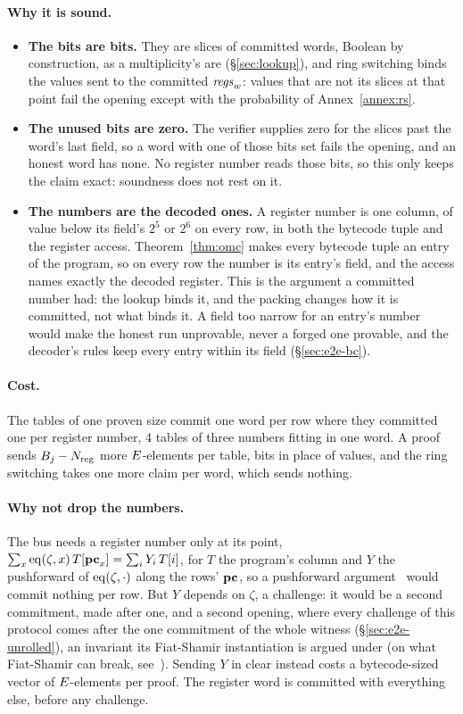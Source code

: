 \paragraph{Why it is sound.}
\begin{itemize}
  \item \textbf{The bits are bits.} They are slices of committed words, Boolean by construction, as a multiplicity's are (\S\ref{sec:lookup}), and ring switching binds the values sent to the committed $\mathit{regs}_{w}$: values that are not its slices at that point fail the opening except with the probability of Annex~\ref{annex:rs}.
  \item \textbf{The unused bits are zero.} The verifier supplies zero for the slices past the word's last field, so a word with one of those bits set fails the opening, and an honest word has none. No register number reads those bits, so this only keeps the claim exact: soundness does not rest on it.
  \item \textbf{The numbers are the decoded ones.} A register number is one column, of value below its field's $2^{5}$ or $2^{6}$ on every row, in both the bytecode tuple and the register access. Theorem~\ref{thm:omc} makes every bytecode tuple an entry of the program, so on every row the number is its entry's field, and the access names exactly the decoded register. This is the argument a committed number had: the lookup binds it, and the packing changes how it is committed, not what binds it. A field too narrow for an entry's number would make the honest run unprovable, never a forged one provable, and the decoder's rules keep every entry within its field (\S\ref{sec:e2e-bc}).
\end{itemize}

\paragraph{Cost.} The tables of one proven size commit one word per row where they committed one per register number, $4$ tables of three numbers fitting in one word. A proof sends $B_{j}-N_{\mathrm{reg}}$ more $E$-elements per table, bits in place of values, and the ring switching takes one more claim per word, which sends nothing.

\paragraph{Why not drop the numbers.} The bus needs a register number only at its point, $\sum_x\operatorname{eq}(\zeta,x)\,T[\mathbf{pc}_x]=\sum_iY_i\,T[i]$, for $T$ the program's column and $Y$ the pushforward of $\operatorname{eq}(\zeta,\cdot)$ along the rows' $\mathbf{pc}$, so a pushforward argument~\cite{Sou25} would commit nothing per row. But $Y$ depends on $\zeta$, a challenge: it would be a second commitment, made after one, and a second opening, where every challenge of this protocol comes after the one commitment of the whole witness (\S\ref{sec:e2e-unrolled}), an invariant its Fiat-Shamir instantiation is argued under (on what Fiat-Shamir can break, see~\cite{KRS25}). Sending $Y$ in clear instead costs a bytecode-sized vector of $E$-elements per proof. The register word is committed with everything else, before any challenge.

